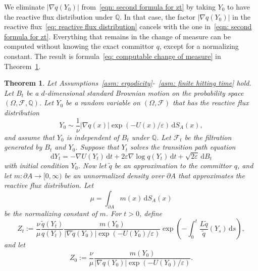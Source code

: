 \documentclass[reqno]{amsart}
\newcommand{\eps}{\varepsilon}
\newcommand{\1}{\mathds{1}}
\renewcommand{\d}{\mathrm{d}}
\newcommand{\grad}{\nabla}
\newcommand{\Q}{\mathds{Q}}
\newcommand{\F}{\mathcal{F}}
\newtheorem{theorem}{Theorem}
\theoremstyle{definition}
\theoremstyle{remark}
\begin{document}
We eliminate $\lvert \grad q(Y_0)\rvert$ from~\eqref{eqn: second formula for zt} by taking $Y_0$ to have the reactive flux distribution under $\Q$. In that case, the factor $\lvert \grad q(Y_0) \rvert$ in the reactive flux~\eqref{eq: reactive flux distribution} cancels with the one in~\eqref{eqn: second formula for zt}. Everything that remains in the change of measure can be computed without knowing the exact committor $q$, except for a normalizing constant. The result is formula~\eqref{eq: computable change of measure} in Theorem~\ref{thm: complete change of measure from transition path process to simulated process}.

\begin{theorem}\label{thm: complete change of measure from transition path process to simulated process}
  Let Assumptions~\ref{asm: ergodicity}-~\ref{asm: finite hitting time} hold. 
  Let $B_t$ be a $d$-dimensional standard Brownian motion on the probability space $(\Omega, \F, \Q)$. Let $Y_0$ be a random variable on $(\Omega, \F)$ that has the reactive flux distribution 
  \begin{equation*}
    Y_0 \sim  \frac{1}{\nu} \lvert  \grad q(x) \rvert \exp(-U(x)/\eps) \, \d S_A(x),
  \end{equation*}
  and assume that $Y_0$ is independent of $B_t$ under $\Q$. Let $\F_t$ be the filtration generated by $B_t$ and $Y_0$. Suppose that $Y_t$ solves the transition path equation
  \begin{equation*}
    \d Y_t = -\grad U(Y_t) \, \d t + 2 \eps \grad \log q(Y_t) \, \d t + \sqrt{2 \eps} \,  \d B_t
  \end{equation*}
  with initial condition $Y_0$. Now let $\tilde q$ be an approximation to the committor $q$, and let $m: \partial A \rightarrow [0,\infty)$ be an unnormalized density over $\partial A$ that approximates the reactive flux distribution.
    Let
  \begin{equation*}
    \mu = \int_{\partial A} m(x) \,  \d S_A (x)
  \end{equation*}
  be the normalizing constant of $m$. 
  For $t >0$, define
  \begin{equation*}
    Z_t := \frac{\nu}{\mu} \frac{\tilde q(Y_t)}{q(Y_t)} \frac{ m(Y_0)}{\lvert \grad \tilde q (Y_0) \rvert \exp(-U(Y_0)/\eps)}\exp \left (-\int_0^t  \frac{L \tilde q}{\tilde q}(Y_s)\, \d s \right ),
  \end{equation*}
  and let
  \begin{equation*}
    Z_0 :=  \frac{\nu}{\mu} \frac{ m(Y_0)}{\lvert \grad q (Y_0) \rvert \exp(-U(Y_0)/\eps)}.

\end{equation*}
\end{theorem}
\end{document}
